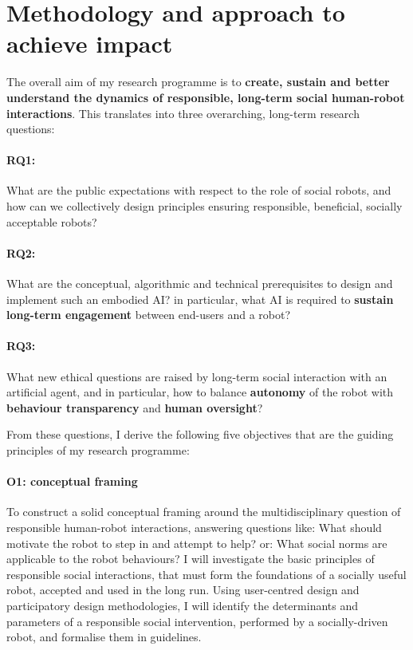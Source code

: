 \vspace{3em}
\section{Methodology and approach to achieve impact}

The overall aim of my research programme is to \textbf{create, sustain and better
understand the dynamics of responsible, long-term social human-robot
interactions}. This translates into three overarching, long-term research questions:

\paragraph{\bf RQ1:} What are the public expectations with respect to the role
of social robots, and how can we collectively design principles ensuring
responsible, beneficial, socially acceptable robots?

\paragraph{\bf RQ2:} What are the conceptual, algorithmic and technical
prerequisites to design and implement such an embodied AI? in particular, what
AI is required to \textbf{sustain long-term engagement} between
end-users and a robot?

\paragraph{\bf RQ3:} What new ethical questions are raised by long-term social
interaction with an artificial agent, and in particular, how to balance
\textbf{autonomy} of the robot with \textbf{behaviour transparency} and
\textbf{human oversight}?

\vspace{0.5em}
\noindent From these questions, I derive the following five objectives that are
the guiding principles of my research programme:

\paragraph{\bf O1: conceptual framing} To construct a solid conceptual framing
around the multidisciplinary question of responsible human-robot interactions,
answering questions like: What should motivate the robot to step in
and attempt to help? or: What social norms are applicable to the robot behaviours? I
will investigate the basic principles of responsible social interactions, that
must form the foundations of a socially useful robot, accepted and used in the
long run.  Using user-centred design and participatory design methodologies, I
will identify the determinants and parameters of a responsible social
intervention, performed by a socially-driven robot, and formalise them in
guidelines.


